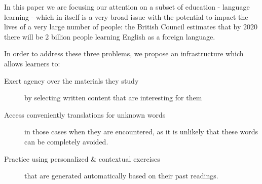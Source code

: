 In this paper we are focusing our attention on a subset of education - language learning - which in itself is a very broad issue with the potential to impact the lives of a very large number of people: the British Council estimates that by 2020 there will be 2 billion people learning English as a foreign language. 


In order to address these three problems, we propose an infrastructure which allows learners to: 

	\begin{description}
	
		\item [Exert agency over the materials they study] by selecting written content that are interesting for them
	
		\item [Access conveniently translations for unknown words] in those cases when they are encountered, as it is unlikely that these words can be completely avoided.

		\item [Practice using personalized \& contextual exercises] that are generated automatically based on their past readings.

	\end{description}




